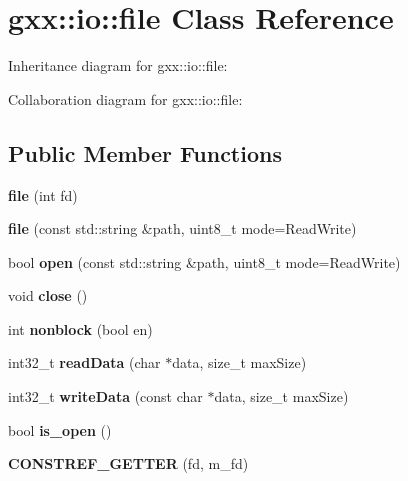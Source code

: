 \hypertarget{classgxx_1_1io_1_1file}{}\section{gxx\+:\+:io\+:\+:file Class Reference}
\label{classgxx_1_1io_1_1file}


Inheritance diagram for gxx\+:\+:io\+:\+:file\+:


Collaboration diagram for gxx\+:\+:io\+:\+:file\+:
\subsection*{Public Member Functions}
\begin{DoxyCompactItemize}
\item 
{\bfseries file} (int fd)\hypertarget{classgxx_1_1io_1_1file_a0c15bddbbdc9ae42222340b520518f52}{}\label{classgxx_1_1io_1_1file_a0c15bddbbdc9ae42222340b520518f52}

\item 
{\bfseries file} (const std\+::string \&path, uint8\+\_\+t mode=Read\+Write)\hypertarget{classgxx_1_1io_1_1file_a593f0de63d9bff88c4dc53d1f0e296ee}{}\label{classgxx_1_1io_1_1file_a593f0de63d9bff88c4dc53d1f0e296ee}

\item 
bool {\bfseries open} (const std\+::string \&path, uint8\+\_\+t mode=Read\+Write)\hypertarget{classgxx_1_1io_1_1file_a0e5d1c616e3b7d33b2350879b491007d}{}\label{classgxx_1_1io_1_1file_a0e5d1c616e3b7d33b2350879b491007d}

\item 
void {\bfseries close} ()\hypertarget{classgxx_1_1io_1_1file_a02ad63d35237ec7b2e98d46c6ba68430}{}\label{classgxx_1_1io_1_1file_a02ad63d35237ec7b2e98d46c6ba68430}

\item 
int {\bfseries nonblock} (bool en)\hypertarget{classgxx_1_1io_1_1file_af3a6e0e06cd4cd8ac3b286e4a0c8b8b6}{}\label{classgxx_1_1io_1_1file_af3a6e0e06cd4cd8ac3b286e4a0c8b8b6}

\item 
int32\+\_\+t {\bfseries read\+Data} (char $\ast$data, size\+\_\+t max\+Size)\hypertarget{classgxx_1_1io_1_1file_af79a1e44cbdc65d8db55f50c5bcd280f}{}\label{classgxx_1_1io_1_1file_af79a1e44cbdc65d8db55f50c5bcd280f}

\item 
int32\+\_\+t {\bfseries write\+Data} (const char $\ast$data, size\+\_\+t max\+Size)\hypertarget{classgxx_1_1io_1_1file_a20d67cc30af4d410f5a2a7445922a429}{}\label{classgxx_1_1io_1_1file_a20d67cc30af4d410f5a2a7445922a429}

\item 
bool {\bfseries is\+\_\+open} ()\hypertarget{classgxx_1_1io_1_1file_a32fa2ef5c3693ce04ac8202b7f6a1bf9}{}\label{classgxx_1_1io_1_1file_a32fa2ef5c3693ce04ac8202b7f6a1bf9}

\item 
{\bfseries C\+O\+N\+S\+T\+R\+E\+F\+\_\+\+G\+E\+T\+T\+ER} (fd, m\+\_\+fd)\hypertarget{classgxx_1_1io_1_1file_a91857983f549b9e0dc1379a5bd054293}{}\label{classgxx_1_1io_1_1file_a91857983f549b9e0dc1379a5bd054293}

\end{DoxyCompactItemize}
